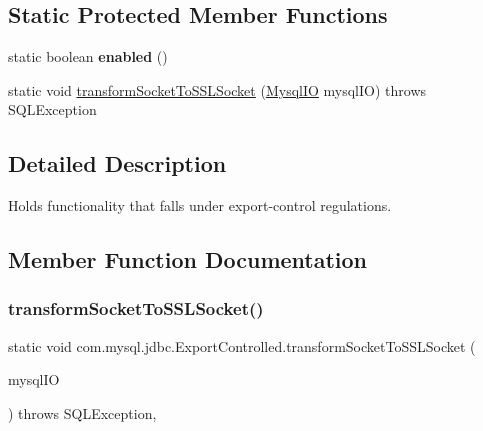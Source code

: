 \subsection*{Static Protected Member Functions}
\begin{DoxyCompactItemize}
\item 
\mbox{\label{classcom_1_1mysql_1_1jdbc_1_1_export_controlled_a9289e83574198220e82df098e2d041c0}} 
static boolean {\bfseries enabled} ()
\item 
static void \mbox{\hyperlink{classcom_1_1mysql_1_1jdbc_1_1_export_controlled_aa291734145187becb4f1fc5f54c65d04}{transform\+Socket\+To\+S\+S\+L\+Socket}} (\mbox{\hyperlink{classcom_1_1mysql_1_1jdbc_1_1_mysql_i_o}{Mysql\+IO}} mysql\+IO)  throws S\+Q\+L\+Exception 
\end{DoxyCompactItemize}


\subsection{Detailed Description}
Holds functionality that falls under export-\/control regulations. 

\subsection{Member Function Documentation}
\mbox{\label{classcom_1_1mysql_1_1jdbc_1_1_export_controlled_aa291734145187becb4f1fc5f54c65d04}} 
\subsubsection{\texorpdfstring{transform\+Socket\+To\+S\+S\+L\+Socket()}{transformSocketToSSLSocket()}}
{\footnotesize\ttfamily static void com.\+mysql.\+jdbc.\+Export\+Controlled.\+transform\+Socket\+To\+S\+S\+L\+Socket (\begin{DoxyParamCaption}\item[{\mbox{\hyperlink{classcom_1_1mysql_1_1jdbc_1_1_mysql_i_o}{Mysql\+IO}}}]{mysql\+IO }\end{DoxyParamCaption}) throws S\+Q\+L\+Exception\hspace{0.3cm}{\ttfamily [static]}, {\ttfamily [protected]}}

